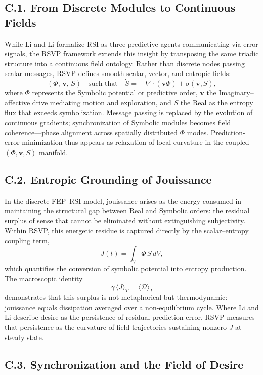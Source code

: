 \documentclass[12pt,a4paper]{article}
\begin{document}
\subsection*{C.1. From Discrete Modules to Continuous Fields}

While Li and Li formalize RSI as three predictive agents communicating via error signals,
the RSVP framework extends this insight by transposing the same triadic structure into a continuous field ontology.  
Rather than discrete nodes passing scalar messages, RSVP defines smooth scalar, vector, and entropic fields:
\[
(\Phi,\, \mathbf{v},\, S)
\quad\text{such that}\quad
\dot{S} = -\,\nabla\!\cdot(\mathbf{v}\Phi) + \sigma(\mathbf{v},S),
\]
where $\Phi$ represents the Symbolic potential or predictive order, $\mathbf{v}$ the Imaginary–affective drive mediating motion and exploration, and $S$ the Real as the entropy flux that exceeds symbolization.  
Message passing is replaced by the evolution of continuous gradients; synchronization of Symbolic modules becomes field coherence—phase alignment across spatially distributed $\Phi$ modes.  
Prediction-error minimization thus appears as relaxation of local curvature in the coupled $(\Phi,\mathbf{v},S)$ manifold.

\subsection*{C.2. Entropic Grounding of Jouissance}

In the discrete FEP–RSI model, jouissance arises as the energy consumed in maintaining the structural gap between Real and Symbolic orders: the residual surplus of sense that cannot be eliminated without extinguishing subjectivity.  
Within RSVP, this energetic residue is captured directly by the scalar–entropy coupling term,
\[
J(t) = \int_V \Phi\,\dot{S}\,dV,
\]
which quantifies the conversion of symbolic potential into entropy production.  
The macroscopic identity
\[
\gamma\,\langle J\rangle_T = \langle\mathcal{D}\rangle_T
\]
demonstrates that this surplus is not metaphorical but thermodynamic: jouissance equals dissipation averaged over a non-equilibrium cycle.  
Where Li and Li describe desire as the persistence of residual prediction error, RSVP measures that persistence as the curvature of field trajectories sustaining nonzero $J$ at steady state.

\subsection*{C.3. Synchronization and the Field of Desire}
\end{document}
